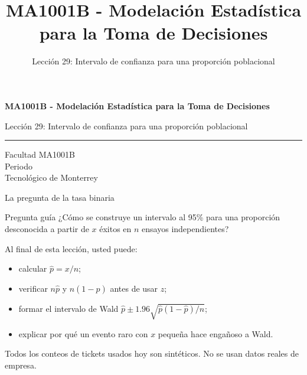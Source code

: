\documentclass[aspectratio=169,10pt,spanish]{beamer}
\title{MA1001B - Modelación Estadística para la Toma de Decisiones}
\subtitle{Lección 29: Intervalo de confianza para una proporción poblacional}
\author{}
\institute{Tecnol\'ogico de Monterrey}
\date{}
\begin{document}
\begin{frame}[plain]
  \vspace{1.2cm}
  {\Large\bfseries MA1001B - Modelación Estadística para la Toma de Decisiones\par}
  \vspace{0.7cm}
  {\large Lección 29: Intervalo de confianza para una proporción poblacional\par}
  \vspace{0.7cm}
  {\color{TecRojo}\rule{\textwidth}{1.2pt}}
  \vspace{0.8cm}

  Facultad MA1001B\\[0.3cm]
  Periodo\\[0.3cm]
  Tecnol\'ogico de Monterrey
\end{frame}

\begin{frame}{La pregunta de la tasa binaria}
  \begin{alertblock}{Pregunta guía}
    ¿Cómo se construye un intervalo al 95\% para una proporción desconocida
    a partir de $x$ éxitos en $n$ ensayos independientes?
  \end{alertblock}

  \vspace{0.6em}
  Al final de esta lección, usted puede:
  \begin{itemize}
    \item calcular $\hat{p}=x/n$;
    \item verificar $n\hat{p}$ y $n(1-\hat{p})$ antes de usar $z$;
    \item formar el intervalo de Wald $\hat{p}\pm 1.96\sqrt{\hat{p}(1-\hat{p})/n}$;
    \item explicar por qué un evento raro con $x$ pequeña hace engañoso a Wald.
  \end{itemize}

  \vfill
  \scriptsize Todos los conteos de tickets usados hoy son sintéticos. No se usan datos reales de empresa.
\end{frame}
\end{document}
